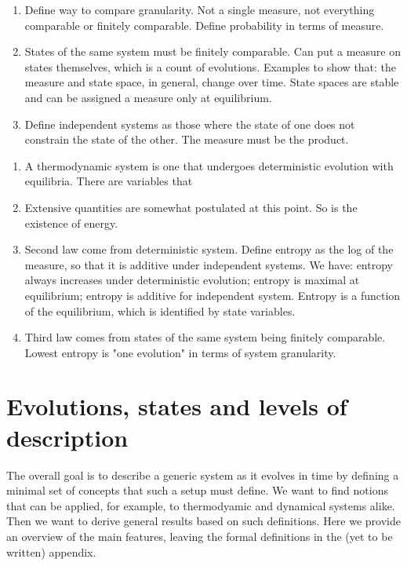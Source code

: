 \documentclass[letterpaper]{article}
\begin{document}
\begin{enumerate}
	\item Define way to compare granularity. Not a single measure, not everything comparable or finitely comparable. Define probability in terms of measure.
	\item States of the same system must be finitely comparable. Can put a measure on states themselves, which is a count of evolutions. Examples to show that: the measure and state space, in general, change over time. State spaces are stable and can be assigned a measure only at equilibrium.
	\item Define independent systems as those where the state of one does not constrain the state of the other. The measure must be the product.
	
\end{enumerate}

\begin{enumerate}
	\item A thermodynamic system is one that undergoes deterministic evolution with equilibria. There are variables that  
	\item Extensive quantities are somewhat postulated at this point. So is the existence of energy.
	\item Second law come from deterministic system.  Define entropy as the log of the measure, so that it is additive under independent systems. We have: entropy always increases under deterministic evolution; entropy is maximal at equilibrium; entropy is additive for independent system. Entropy is a function of the equilibrium, which is identified by state variables.
	\item Third law comes from states of the same system being finitely comparable. Lowest entropy is "one evolution" in terms of system granularity.
	
\end{enumerate}


\section{Evolutions, states and levels of description}

The overall goal is to describe a generic system as it evolves in time by defining a minimal set of concepts that such a setup must define. We want to find notions that can be applied, for example, to thermodyamic and dynamical systems alike. Then we want to derive general results based on such definitions. Here we provide an overview of the main features, leaving the formal definitions in the (yet to be written) appendix.
\end{document}
